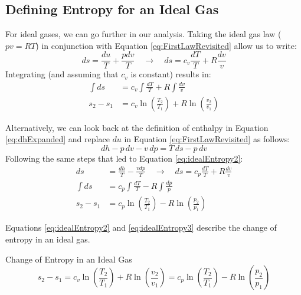 \subsection{Defining Entropy for an Ideal Gas}

For ideal gases, we can go further in our analysis.  Taking the ideal gas law ($pv = RT$) in conjunction with Equation \ref{eq:FirstLawRevisited} allow us to write:
\begin{equation} \label{eq:idealEntropy1}
  ds  = \frac{du}{T}+ \frac{pdv}{T} \quad\rightarrow\quad ds = c_v \frac{dT}{T} + R\frac{dv}{v}
\end{equation}
Integrating \label{eq:idealEntropy1} (and assuming that $c_v$ is constant) results in:
\begin{align} 
  \nonumber  \int ds &= c_v \int \frac{dT}{T} + R \int \frac{dv}{v} \\
  \label{eq:idealEntropy2} s_2 - s_1 &= c_v \ln \left(\frac{T_2}{T_1}\right) + R \ln \left(\frac{v_2}{v_1}\right)
\end{align}

Alternatively, we can look back at the definition of enthalpy in Equation \ref{eq:dhExpanded} and replace $du$ in Equation \ref{eq:FirstLawRevisited} as follows:
\begin{equation*}
  dh - p\,dv - v\,dp = T\,ds - p\,dv
\end{equation*}
Following the same steps that led to Equation \ref{eq:idealEntropy2}:
\begin{align}
  \nonumber ds  &= \frac{dh}{T}- \frac{vdp}{T} \quad \rightarrow\quad ds = c_p \frac{dT}{T} + R\frac{dv}{v} \\
  \nonumber  \int ds &= c_p \int \frac{dT}{T} - R \int \frac{dp}{p} \\
  \label{eq:idealEntropy3} s_2 - s_1 &= c_p \ln \left(\frac{T_2}{T_1}\right) - R \ln \left(\frac{p_2}{p_1}\right)
\end{align}

Equations \ref{eq:idealEntropy2} and \ref{eq:idealEntropy3} describe the change of entropy in an ideal gas.

\begin{quoteWithTitle}{Change of Entropy in an Ideal Gas}%
  \begin{equation*}
    s_2 - s_1 = c_v \ln \left(\frac{T_2}{T_1}\right) + R \ln \left(\frac{v_2}{v_1}\right) =
    c_p \ln \left(\frac{T_2}{T_1}\right) - R \ln \left(\frac{p_2}{p_1}\right)
  \end{equation*}
\end{quoteWithTitle}

